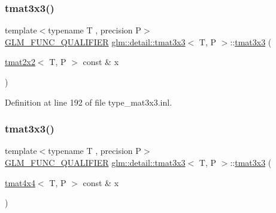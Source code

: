\mbox{\label{structglm_1_1detail_1_1tmat3x3_a421b7ee49440a7e1f0a576895f6e6363}} 
\subsubsection{\texorpdfstring{tmat3x3()}{tmat3x3()}\hspace{0.1cm}{\footnotesize\ttfamily [11/22]}}
{\footnotesize\ttfamily template$<$typename T , precision P$>$ \\
\hyperlink{setup_8hpp_a33fdea6f91c5f834105f7415e2a64407}{G\+L\+M\+\_\+\+F\+U\+N\+C\+\_\+\+Q\+U\+A\+L\+I\+F\+I\+ER} \hyperlink{structglm_1_1detail_1_1tmat3x3}{glm\+::detail\+::tmat3x3}$<$ T, P $>$\+::\hyperlink{structglm_1_1detail_1_1tmat3x3}{tmat3x3} (\begin{DoxyParamCaption}\item[{\hyperlink{structglm_1_1detail_1_1tmat2x2}{tmat2x2}$<$ T, P $>$ const \&}]{x }\end{DoxyParamCaption})\hspace{0.3cm}{\ttfamily [explicit]}}



Definition at line 192 of file type\+\_\+mat3x3.\+inl.

\mbox{\label{structglm_1_1detail_1_1tmat3x3_a38cd720277c46b3768db3318960649d3}} 
\subsubsection{\texorpdfstring{tmat3x3()}{tmat3x3()}\hspace{0.1cm}{\footnotesize\ttfamily [12/22]}}
{\footnotesize\ttfamily template$<$typename T , precision P$>$ \\
\hyperlink{setup_8hpp_a33fdea6f91c5f834105f7415e2a64407}{G\+L\+M\+\_\+\+F\+U\+N\+C\+\_\+\+Q\+U\+A\+L\+I\+F\+I\+ER} \hyperlink{structglm_1_1detail_1_1tmat3x3}{glm\+::detail\+::tmat3x3}$<$ T, P $>$\+::\hyperlink{structglm_1_1detail_1_1tmat3x3}{tmat3x3} (\begin{DoxyParamCaption}\item[{\hyperlink{structglm_1_1detail_1_1tmat4x4}{tmat4x4}$<$ T, P $>$ const \&}]{x }\end{DoxyParamCaption})\hspace{0.3cm}{\ttfamily [explicit]}}



